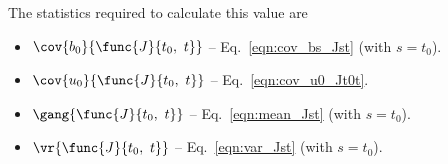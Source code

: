 The statistics required to calculate this value are

\begin{itemize}
	\item [] $\cov{b_0}{\func{J}{t_0,\ t}}$ -- Eq.~\ref{eqn:cov_bs_Jst} (with $s = t_0$).
	\item [] $\cov{u_0}{\func{J}{t_0,\ t}}$ -- Eq.~\ref{eqn:cov_u0_Jt0t}.
	\item [] $\gang{\func{J}{t_0,\ t}}$ -- Eq.~\ref{eqn:mean_Jst} (with $s = t_0$).
	\item [] $\vr{\func{J}{t_0,\ t}}$ -- Eq.~\ref{eqn:var_Jst} (with $s = t_0$).
\end{itemize}